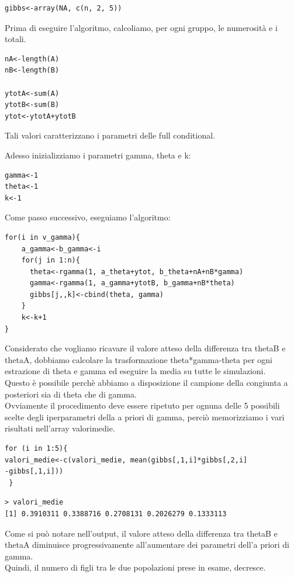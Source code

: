 \begin{enumerate}
\begin{lstlisting}[style=R]
gibbs<-array(NA, c(n, 2, 5))
\end{lstlisting}

Prima di eseguire l'algoritmo, calcoliamo, per ogni gruppo, le numerosità e i totali.
\begin{lstlisting}[style=R]
nA<-length(A)
nB<-length(B)

ytotA<-sum(A)
ytotB<-sum(B)
ytot<-ytotA+ytotB
\end{lstlisting}

Tali valori caratterizzano i parametri delle full conditional.

Adesso inizializziamo i parametri gamma, theta e k: 
\begin{lstlisting}[style=R]
gamma<-1
theta<-1
k<-1
\end{lstlisting}

Come passo successivo, eseguiamo l'algoritmo:
\begin{lstlisting}[style=R]
for(i in v_gamma){
    a_gamma<-b_gamma<-i
    for(j in 1:n){
      theta<-rgamma(1, a_theta+ytot, b_theta+nA+nB*gamma)
      gamma<-rgamma(1, a_gamma+ytotB, b_gamma+nB*theta)
      gibbs[j,,k]<-cbind(theta, gamma)
    }
    k<-k+1
}
\end{lstlisting}

Considerato che vogliamo ricavare il valore atteso della differenza tra thetaB e thetaA, dobbiamo calcolare la trasformazione theta*gamma-theta per ogni estrazione di theta e gamma ed eseguire la media su tutte le simulazioni. \\
Questo è possibile perchè abbiamo a disposizione il campione della congiunta a posteriori sia di theta che di gamma. \\
Ovviamente il procedimento deve essere ripetuto per ognuna delle 5 possibili scelte degli iperparametri della a priori di gamma, perciò memorizziamo i vari risultati nell'array valori\textunderscore medie.

\begin{lstlisting}[style=R] 
for (i in 1:5){
valori_medie<-c(valori_medie, mean(gibbs[,1,i]*gibbs[,2,i]
-gibbs[,1,i]))
 }
\end{lstlisting}

{
\color{red}
\begin{Verbatim}
> valori_medie
[1] 0.3910311 0.3388716 0.2708131 0.2026279 0.1333113
\end{Verbatim}
}

Come si può notare nell'output, il valore atteso della differenza tra thetaB e thetaA diminuisce 
progressivamente all'aumentare dei parametri dell'a priori di gamma. \\
Quindi, il numero di figli tra le due popolazioni prese in esame, decresce.


\end{enumerate}
